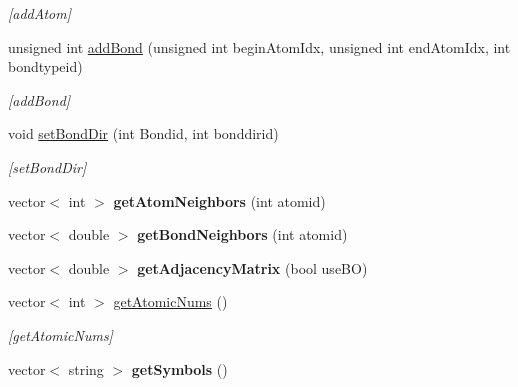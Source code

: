 \begin{DoxyCompactItemize}
\begin{DoxyCompactList}\small\item\em \mbox{[}add\+Atom\mbox{]} \end{DoxyCompactList}\item 
unsigned int \mbox{\hyperlink{class_molecule_ad1c8dfe8ea7c2026bcdbdd2c90fa17b8}{add\+Bond}} (unsigned int begin\+Atom\+Idx, unsigned int end\+Atom\+Idx, int bondtypeid)
\begin{DoxyCompactList}\small\item\em \mbox{[}add\+Bond\mbox{]} \end{DoxyCompactList}\item 
void \mbox{\hyperlink{class_molecule_a21ccf25eb7aa1fb6c5827a7c6c01d926}{set\+Bond\+Dir}} (int Bondid, int bonddirid)
\begin{DoxyCompactList}\small\item\em \mbox{[}set\+Bond\+Dir\mbox{]} \end{DoxyCompactList}\item 
\mbox{\label{class_molecule_a8a7e0db0469ed164e76f4fc48f4e387b}} 
vector$<$ int $>$ {\bfseries get\+Atom\+Neighbors} (int atomid)
\item 
\mbox{\label{class_molecule_a8b75895f9b9d0c50fa856b0d5289bf5f}} 
vector$<$ double $>$ {\bfseries get\+Bond\+Neighbors} (int atomid)
\item 
\mbox{\label{class_molecule_a7ee37a53f63c296a206a20b69808cff8}} 
vector$<$ double $>$ {\bfseries get\+Adjacency\+Matrix} (bool use\+BO)
\item 
vector$<$ int $>$ \mbox{\hyperlink{class_molecule_ac4010a4be90b8f109903d41a05d3ff81}{get\+Atomic\+Nums}} ()
\begin{DoxyCompactList}\small\item\em \mbox{[}get\+Atomic\+Nums\mbox{]} \end{DoxyCompactList}\item 
\mbox{\label{class_molecule_afe8104a0a538fe6b64c089d409871f0d}} 
vector$<$ string $>$ {\bfseries get\+Symbols} ()
\end{DoxyCompactItemize}
